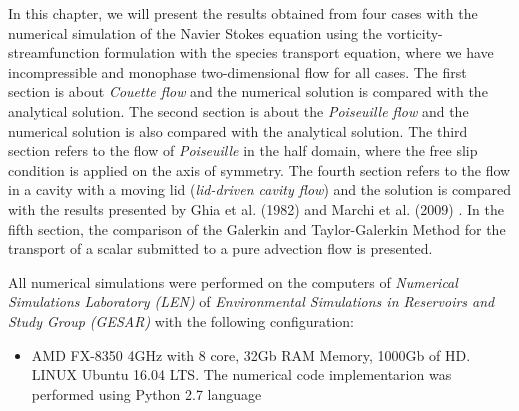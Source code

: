 In this chapter, we will present the results obtained from 
four cases with the numerical simulation of the Navier Stokes 
equation using the vorticity-streamfunction formulation with 
the species transport equation, where we have incompressible 
and monophase two-dimensional flow for all cases. 
The first section is about \textit{Couette flow} and 
the numerical solution is compared with the analytical solution. 
The second section is about the \textit{Poiseuille flow} 
and the numerical solution is also compared with 
the analytical solution. The third section refers to the flow 
of \textit {Poiseuille} in the half domain, where the 
free slip condition is applied on the axis of symmetry. 
The fourth section refers to the flow in a cavity with 
a moving lid (\textit{lid-driven cavity flow}) 
and the solution is compared with the results presented 
by Ghia et al. (1982) \cite{ghia1982} and 
Marchi et al. (2009) \cite{marchi2009}. 
In the fifth section, the comparison of the Galerkin and 
Taylor-Galerkin Method for the transport of a scalar 
submitted to a pure advection flow is presented.

\medskip
All numerical simulations were performed on the computers 
of \textit {Numerical Simulations Laboratory (LEN)} 
of \textit {Environmental Simulations in Reservoirs and 
Study Group (GESAR)} with the following configuration:

\begin{itemize}
 \item AMD FX-8350 4GHz with 8 core, 32Gb RAM Memory, 1000Gb of HD.
       LINUX Ubuntu 16.04 LTS. The numerical code implementarion was
       performed using Python 2.7 language
\end{itemize}
